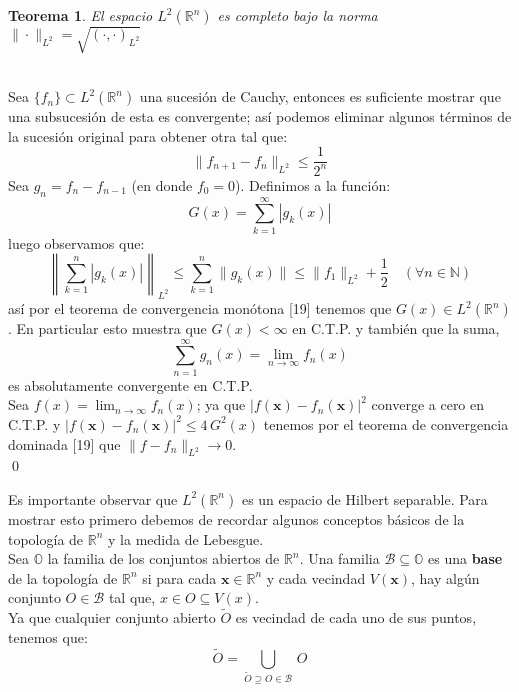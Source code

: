 \documentclass[12pt]{book}
\numberwithin{equation}{chapter}
\newtheorem{theorem}{Teorema}[chapter]
\def\n{\noindent}
\def\R{\mathbb{R}}
\def\B{\mathcal{B}}
\def\rar{\rightarrow}
\def\x{\mathbf{x}}
\begin{document}
\begin{theorem}
El espacio $L^{2}(\R^{n})$ es completo bajo la norma $\| \cdot \|_{L^{2}}= \sqrt{( \cdot , \cdot )_{L^{2}}}$
\end{theorem}
\n {\bf Demostraci\'on}\\
Sea $\{ f_{n} \} \subset L^{2}(\R^{n})$ una sucesi\'on de Cauchy, entonces es suficiente mostrar que una subsucesi\'on de esta es convergente; as\'i podemos eliminar algunos t\'erminos de la sucesi\'on original para obtener otra tal que:
$$ \| f_{n+1} - f_{n} \|_{L^{2}} \leq \frac{1}{2^{n}} $$   
Sea $ g_{n}= f_{n} - f_{n-1} $ (en donde $f_{0}=0$). Definimos a la funci\'on:
$$ G(x)=\sum_{k=1}^{\infty} |g_{k}(x)| $$
luego observamos que:
$$ \left\| \sum_{k=1}^{n} |g_{k}(x)| \right\|_{L^{2}} \leq \sum_{k=1}^{n} \| g_{k}(x) \| \leq \|f_{1}\|_{L^{2}} + \frac{1}{2} \,\,\,\,\,\, (\forall n \in \mathbb{N}) $$
as\'i por el teorema de convergencia mon\'otona [19] tenemos que $G(x) \in L^{2}(\R^{n})$. En particular esto muestra que $G(x) < \infty $ en C.T.P. y tambi\'en que la suma,
$$ \sum_{n=1}^{\infty} g_{n}(x)= \lim_{n \rar \infty} f_{n}(x) $$
es absolutamente convergente en C.T.P.\\
Sea $f(x)= \lim_{n \rar \infty} f_{n}(x) $; ya que $ | f(\x) - f_{n}(\x) |^{2} $ converge a cero en C.T.P. y $| f(\x) - f_{n}(\x) |^{2} \leq 4\, G^{2}(x) $ tenemos por el teorema de convergencia dominada [19] que $ \| f-f_{n} \|_{L^{2}} \rar 0 $. \\ \qed

\vspace{5 mm}

Es importante observar que $L^{2}(\R^{n})$ es un espacio de Hilbert separable. Para mostrar esto primero debemos de recordar algunos conceptos b\'asicos de la topolog\'ia de $\R^{n}$ y la medida de Lebesgue.\\

Sea $\mathbb{O}$ la familia de los conjuntos abiertos de $\R^{n}$. Una familia $\B \subseteq \mathbb{O} $ es una {\bf base} de la topolog\'ia de $\R^{n}$ si para cada $\x \in \R^{n}$ y cada vecindad $V(\x)$, hay alg\'un conjunto $O \in \B$ tal que, $ x \in O \subseteq V(x) $. \\
Ya que cualquier conjunto abierto $\tilde{O}$ es vecindad de cada uno de sus puntos, tenemos que:
$$ \tilde{O}= \bigcup_{\tilde{O} \supseteq O \in \B }\, O $$
\end{document}
